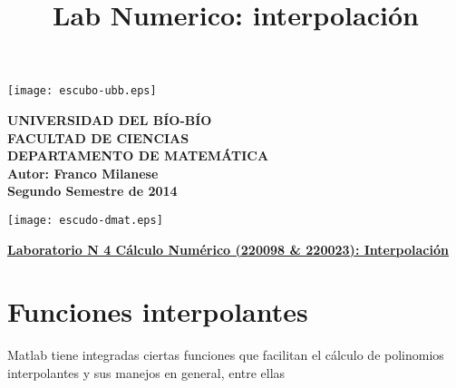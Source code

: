 \documentclass[12pt,letterpaper]{article}
\begin{document}
\title{Lab Numerico: interpolación}
{\begin{minipage}{2cm}
\hspace*{1cm}\texttt{[image: escubo-ubb.eps]}
\end{minipage}
\begin{minipage}{12cm}
\small
{\bf \rm
{\hspace*{3.1cm} {\footnotesize UNIVERSIDAD DEL B\'IO-B\'IO} \\
 \hspace*{3.7cm} {\scriptsize FACULTAD DE CIENCIAS}  \\
  \hspace*{2.9cm} {\scriptsize DEPARTAMENTO DE MATEM\'ATICA}  \\
\hspace*{3.75cm} {\scriptsize Autor: Franco Milanese}\\
\hspace*{3.75cm} {\scriptsize Segundo Semestre de 2014}}}
\end{minipage}}
{\begin{minipage}{2cm}
\hspace*{-0.5cm}\vspace*{-0.05cm}\texttt{[image: escudo-dmat.eps]}
\end{minipage}}

\hspace*{-1,5cm}

\vspace*{0.1cm} \centerline {\bf\underline{Laboratorio N 4 C\'alculo Num\'erico (220098 \& 220023): Interpolaci\'on}} \vskip0.5cm

\section{Funciones interpolantes}


Matlab tiene integradas ciertas funciones que facilitan el c\'alculo de polinomios interpolantes y sus manejos en general, entre ellas
\end{document}
